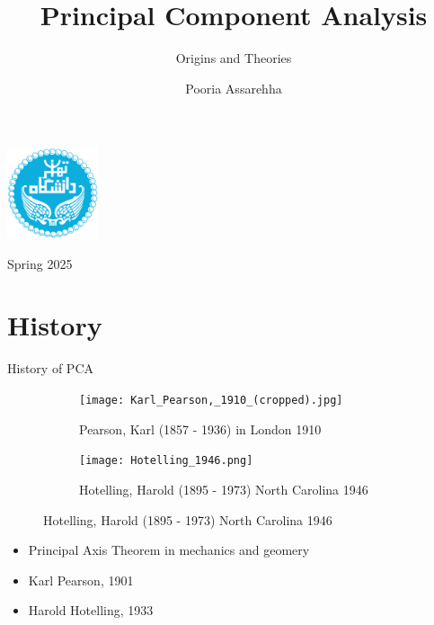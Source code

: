 \documentclass{beamer}
\title[PCA]{Principal Component Analysis}
\subtitle{Origins and Theories}
\author{Pooria Assarehha \vspace{-3mm}}
\institute{Department of Mathematics, Statistics \\ and Computer Science}
\date{\empty}
\begin{document}
\graphicspath{{./figs/}}

\begin{frame}
    \titlepage
    \vspace{-1.5cm}
    \begin{center}
        \includegraphics[width=0.2\textwidth]{ut.png}
    \end{center}
    \vspace{-5mm}
    \centering \small Spring 2025
\end{frame}

\section{History}
\begin{frame}{History of PCA}
    \begin{figure}
        \begin{subfigure}[t]{0.35\textwidth}
            \texttt{[image: Karl\_Pearson,\_1910\_(cropped).jpg]}
            \caption{Pearson, Karl (1857 - 1936) in London 1910}
        \end{subfigure}
        \hfill
        \begin{subfigure}[t]{0.55\textwidth}
            \texttt{[image: Hotelling\_1946.png]}
            \caption{Hotelling, Harold (1895 - 1973) North Carolina 1946}
        \end{subfigure}
    \end{figure}
    \vspace{-3mm}
    \begin{itemize}
        \item Principal Axis Theorem in mechanics and geomery
        \item Karl Pearson, 1901 \cite{pearson1901}
        \item Harold Hotelling, 1933 \cite{hotelling1933}
    \end{itemize}
\end{frame}
\end{document}
